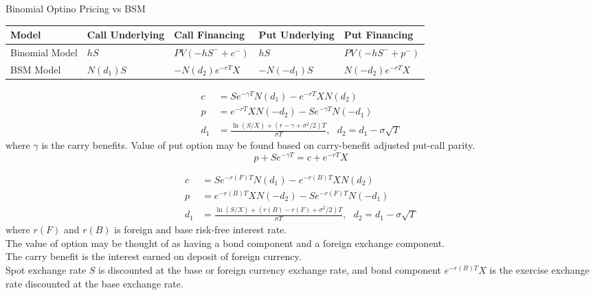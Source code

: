 \begin{flushleft}
Binomial Optino Pricing vs BSM
\begin{tabularx}{\textwidth}{p{11em}|X|X|X|X}
\hline
\rowcolor{gray!30}
Model & Call Underlying & Call Financing & Put Underlying & Put Financing \\
\hline
Binomial Model & $hS$ & $PV(-hS^- + c^-)$ & $hS$ & $PV(-hS^- + p^-)$ \\
BSM Model & $N(d_1)S$ & $-N(d_2) e^{-rT} X$ & $-N(-d_1)S$ & $N(-d_2) e^{-rT}X$ \\
\hline
\end{tabularx}
\end{flushleft}

\begin{remark} 
\begin{align}
c &= Se^{-\gamma T}N(d_1) - e^{-rT}XN(d_2) \nonumber \\
p &= e^{-rT}XN(-d_2) - Se^{-\gamma T}N(-d_1) \nonumber \\
d_1 &= \frac{\ln(S/X) + (r - \gamma + \sigma^2/2)T}{\sigma T}, \ \ \ d_2 = d_1 - \sigma\sqrt{T} \nonumber
\end{align}
where $\gamma$ is the carry benefits. Value of put option may be found based on carry-benefit adjusted put-call parity.
\begin{equation}
p + S e^{-\gamma T} = c + e^{-rT} X \nonumber
\end{equation}
\end{remark}

\begin{remark} 
\begin{align}
c &= Se^{-r(F)T}N(d_1) - e^{-r(B)T}XN(d_2) \nonumber \\
p &= e^{-r(B)T}XN(-d_2) - Se^{-r(F)T}N(-d_1) \nonumber \\
d_1 &= \frac{\ln(S/X) + (r(B) - r(F) + \sigma^2/2)T}{\sigma T}, \ \ \ d_2 = d_1 - \sigma\sqrt{T} \nonumber
\end{align}
where $r(F)$ and $r(B)$ is foreign and base risk-free interest rate.\\
The value of option may be thought of as having a bond component and a foreign exchange component.\\
The carry benefit is the interest earned on deposit of foreign currency.\\
Spot exchange rate $S$ is discounted at the base or foreign currency exchange rate, and bond component $e^{-r(B)T}X$ is the exercise exchange rate discounted at the base exchange rate.
\end{remark}

